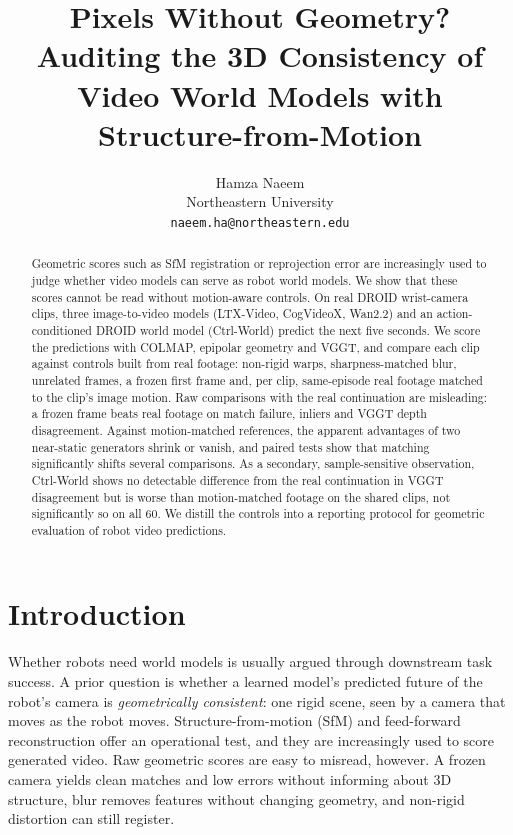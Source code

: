 \documentclass{article}
\title{Pixels Without Geometry? Auditing the 3D Consistency of Video World Models with Structure-from-Motion}
\author{
  Hamza Naeem\\
  Northeastern University\\
  \texttt{naeem.ha@northeastern.edu}
}
\begin{document}
\maketitle

\begin{abstract}
Geometric scores such as SfM registration or reprojection error are increasingly used to judge
whether video models can serve as robot world models. We show that these scores cannot be read
without motion-aware controls. On real DROID wrist-camera clips, three image-to-video models
(LTX-Video, CogVideoX, Wan2.2) and an action-conditioned DROID world model (Ctrl-World) predict the
next five seconds. We score the predictions with COLMAP, epipolar geometry and VGGT, and compare each
clip against controls built from real footage: non-rigid warps, sharpness-matched blur, unrelated
frames, a frozen first frame and, per clip, same-episode real footage matched to the clip's image
motion. Raw comparisons with the real continuation are misleading: a frozen frame beats real footage
on match failure, inliers and VGGT depth disagreement. Against motion-matched references, the apparent
advantages of two near-static generators shrink or vanish, and paired tests show that matching
significantly shifts several comparisons. As a secondary, sample-sensitive observation, Ctrl-World
shows no detectable difference from the real continuation in VGGT disagreement but is worse than
motion-matched footage on the shared clips, not significantly so on all 60. We distill the controls
into a reporting protocol for geometric evaluation of robot video predictions.
\end{abstract}


\section{Introduction}
Whether robots need world models is usually argued through downstream task success. A prior
question is whether a learned model's predicted future of the robot's camera is \emph{geometrically
consistent}: one rigid scene, seen by a camera that moves as the robot moves. Structure-from-motion
(SfM) and feed-forward reconstruction offer an operational test, and they are increasingly used to
score generated video. Raw geometric scores are easy to misread, however. A frozen camera yields
clean matches and low errors without informing about 3D structure, blur removes features without
changing geometry, and non-rigid distortion can still register.
\end{document}
